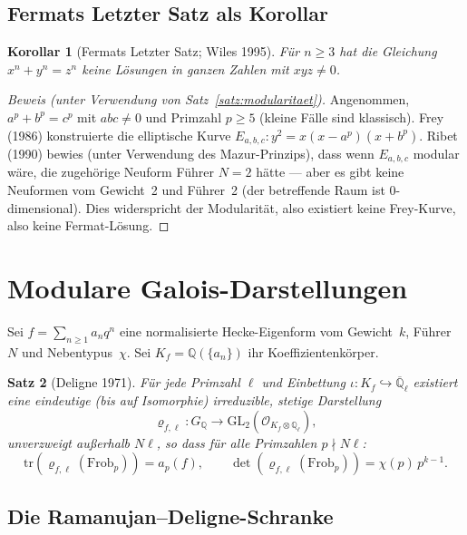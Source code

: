 \documentclass[a4paper,12pt]{amsart}
\newtheorem{theorem}{Satz}[section]
\newtheorem{korollar}[theorem]{Korollar}
\theoremstyle{definition}
\theoremstyle{remark}
\newcommand{\Q}{\mathbb{Q}}
\newcommand{\Ql}{\mathbb{Q}_\ell}
\newcommand{\GL}{\mathrm{GL}}
\newcommand{\Frob}{\mathrm{Frob}}
\newcommand{\Spur}{\mathrm{tr}}
\begin{document}
\subsection{Fermats Letzter Satz als Korollar}

\begin{korollar}[Fermats Letzter Satz; Wiles 1995]
Für $n \geq 3$ hat die Gleichung $x^n + y^n = z^n$ keine Lösungen in ganzen
Zahlen mit $xyz \neq 0$.
\end{korollar}

\begin{proof}[Beweis (unter Verwendung von Satz~\ref{satz:modularitaet})]
Angenommen, $a^p + b^p = c^p$ mit $abc \neq 0$ und Primzahl $p \geq 5$ (kleine Fälle
sind klassisch). Frey (1986) konstruierte die elliptische Kurve
$E_{a,b,c}\colon y^2 = x(x-a^p)(x+b^p)$. Ribet (1990) bewies (unter Verwendung des
Mazur-Prinzips), dass wenn $E_{a,b,c}$ modular wäre, die zugehörige Neuform Führer
$N = 2$ hätte --- aber es gibt keine Neuformen vom Gewicht~2 und Führer~2 (der
betreffende Raum ist 0-dimensional). Dies widerspricht der Modularität, also existiert
keine Frey-Kurve, also keine Fermat-Lösung.
\end{proof}

\section{Modulare Galois-Darstellungen}
\label{sec:modulformen}

Sei $f = \sum_{n \geq 1} a_n q^n$ eine normalisierte Hecke-Eigenform vom Gewicht~$k$,
Führer~$N$ und Nebentypus~$\chi$. Sei $K_f = \Q(\{a_n\})$ ihr Koeffizientenkörper.

\begin{theorem}[Deligne 1971]
\label{satz:deligne}
Für jede Primzahl $\ell$ und Einbettung $\iota\colon K_f \hookrightarrow \overline{\Q}_\ell$
existiert eine eindeutige (bis auf Isomorphie) irreduzible, stetige Darstellung
\[
  \varrho_{f,\ell}\colon G_\Q \to \GL_2(\mathcal{O}_{K_f \otimes \Ql}),
\]
unverzweigt außerhalb $N\ell$, so dass für alle Primzahlen $p \nmid N\ell$:
\[
  \Spur(\varrho_{f,\ell}(\Frob_p)) = a_p(f), \qquad
  \det(\varrho_{f,\ell}(\Frob_p)) = \chi(p)\, p^{k-1}.
\]
\end{theorem}

\subsection{Die Ramanujan--Deligne-Schranke}
\end{document}
